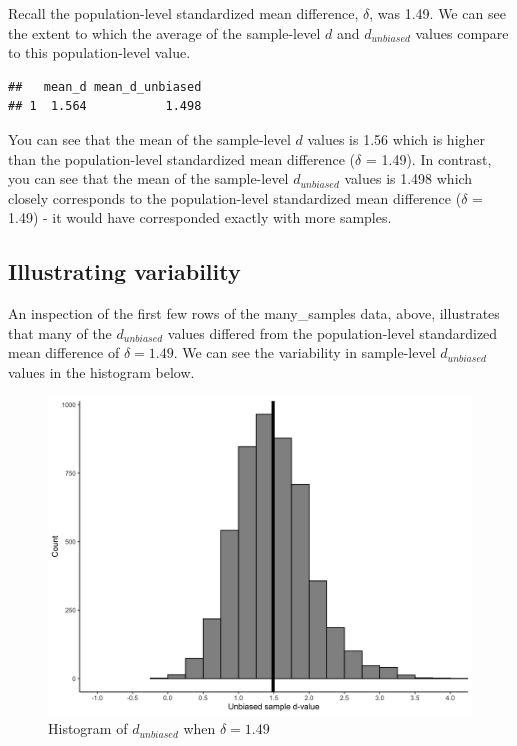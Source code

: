 \documentclass[
]{krantz}
\makeatletter
\newenvironment{Shaded}{\begin{snugshade}}{\end{snugshade}}
\newcommand{\DataTypeTok}[1]{\textcolor[rgb]{0.27,0.27,0.27}{#1}}
\newcommand{\KeywordTok}[1]{\textcolor[rgb]{0.27,0.27,0.27}{\textbf{#1}}}
\newcommand{\NormalTok}[1]{#1}
\newcommand{\OperatorTok}[1]{\textcolor[rgb]{0.43,0.43,0.43}{\textbf{#1}}}
\newcommand{\StringTok}[1]{\textcolor[rgb]{0.5,0.5,0.5}{#1}}
\newenvironment{kframe}{%
\medskip{}
\setlength{\fboxsep}{.8em}
 \def\at@end@of@kframe{}%
 \ifinner\ifhmode%
  \def\at@end@of@kframe{\end{minipage}}%
  \begin{minipage}{\columnwidth}%
 \fi\fi%
 \def\FrameCommand##1{\hskip\@totalleftmargin \hskip-\fboxsep
 \colorbox{shadecolor}{##1}\hskip-\fboxsep
     \hskip-\linewidth \hskip-\@totalleftmargin \hskip\columnwidth}%
 \MakeFramed {\advance\hsize-\width
   \@totalleftmargin\z@ \linewidth\hsize
   \@setminipage}}%
 {\par\unskip\endMakeFramed%
 \at@end@of@kframe}
\renewenvironment{Shaded}{\begin{kframe}}{\end{kframe}}
\makeatother
\begin{document}
Recall the population-level standardized mean difference, \(\delta\), was 1.49. We can see the extent to which the average of the sample-level \(d\) and \(d_{unbiased}\) values compare to this population-level value.

\begin{Shaded}
\end{Shaded}

\begin{verbatim}
##   mean_d mean_d_unbiased
## 1  1.564           1.498
\end{verbatim}

You can see that the mean of the sample-level \(d\) values is 1.56 which is higher than the population-level standardized mean difference (\(\delta\) = 1.49). In contrast, you can see that the mean of the sample-level \(d_{unbiased}\) values is 1.498 which closely corresponds to the population-level standardized mean difference (\(\delta\) = 1.49) - it would have corresponded exactly with more samples.

\hypertarget{illustrating-variability}{%
\subsection{Illustrating variability}\label{illustrating-variability}}

An inspection of the first few rows of the many\_samples data, above, illustrates that many of the \(d_{unbiased}\) values differed from the population-level standardized mean difference of \(\delta = 1.49\). We can see the variability in sample-level \(d_{unbiased}\) values in the histogram below.

\begin{figure}
\includegraphics[width=0.95\linewidth]{ch_samples/images/d_dist} \caption{Histogram of $d_{unbiased}$ when $\delta = 1.49$}\label{fig:ddist}
\end{figure}
\end{document}
